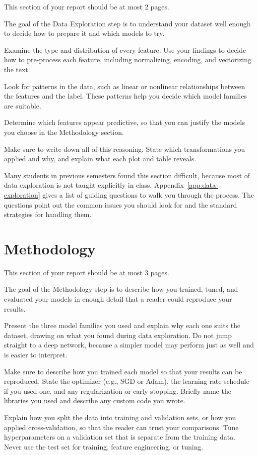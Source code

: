 \documentclass[12pt]{article}
\begin{document}
This section of your report should be at most 2 pages. 

The goal of the Data Exploration step is to understand your dataset well enough to decide how to prepare it and which models to try.

Examine the type and distribution of every feature. Use your findings to decide how to pre-process each feature, including normalizing, encoding, and vectorizing the text.

Look for patterns in the data, such as linear or nonlinear relationships between the features and the label. These patterns help you decide which model families are suitable.

Determine which features appear predictive, so that you can justify the models you choose in the Methodology section.

Make sure to write down all of this reasoning. State which transformations you applied and why, and explain what each plot and table reveals.

Many students in previous semesters found this section difficult, because most of data exploration is not taught explicitly in class. Appendix~\ref{app:data-exploration} gives a list of guiding questions to walk you through the process. The questions point out the common issues you should look for and the standard strategies for handling them.

\section{Methodology}\label{sec:methodology}

This section of your report should be at most 3 pages.

The goal of the Methodology step is to describe how you trained, tuned, and evaluated your models in enough detail that a reader could reproduce your results.

Present the three model families you used and explain why each one suits the dataset, drawing on what you found during data exploration. Do not jump straight to a deep network, because a simpler model may perform just as well and is easier to interpret.

Make sure to describe how you trained each model so that your results can be reproduced. State the optimizer (e.g., SGD or Adam), the learning rate schedule if you used one, and any regularization or early stopping. Briefly name the libraries you used and describe any custom code you wrote.

Explain how you split the data into training and validation sets, or how you applied cross-validation, so that the reader can trust your comparisons. Tune hyperparameters on a validation set that is separate from the training data. Never use the test set for training, feature engineering, or tuning.
\end{document}
